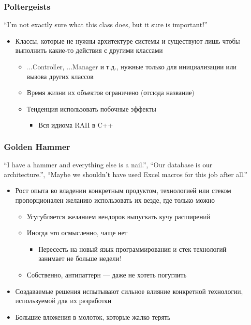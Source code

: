 \documentclass[xetex,mathserif,serif]{beamer}
\begin{document}
	\begin{frame}
		\frametitle{Poltergeists}
		``I’m not exactly sure what this class does, but it sure is important!''
		\begin{itemize}
			\item Классы, которые не нужны архитектуре системы и существуют лишь чтобы выполнить какие-то действия с другими классами
			\begin{itemize}
				\item ...Controller, ...Manager и т.д., нужные только для инициализации или вызова других классов
				\item Время жизни их объектов ограничено (отсюда название)
				\item Тенденция использовать побочные эффекты
				\begin{itemize}
					\item Вся идиома RAII в C++
				\end{itemize}
			\end{itemize}
		\end{itemize}
	\end{frame}

	\begin{frame}
		\frametitle{Golden Hammer}
		``I have a hammer and everything else is a nail.'', ``Our database is our architecture.'', ``Maybe we shouldn’t have used Excel macros for this job after all.''
		\begin{itemize}
			\item Рост опыта во владении конкретным продуктом, технологией или стеком пропорционален желанию использовать их везде, где только можно
			\begin{itemize}
				\item Усугубляется желанием вендоров выпускать кучу расширений
				\item Иногда это осмысленно, чаще нет
				\begin{itemize}
					\item Пересесть на новый язык программирования и стек технологий занимает не больше недели!
				\end{itemize}
				\item Собственно, антипаттерн --- даже не хотеть погуглить
			\end{itemize}
			\item Создаваемые решения испытывают сильное влияние конкретной технологии, используемой для их разработки
			\item Большие вложения в молоток, которые жалко терять
		\end{itemize}
	\end{frame}
\end{document}

